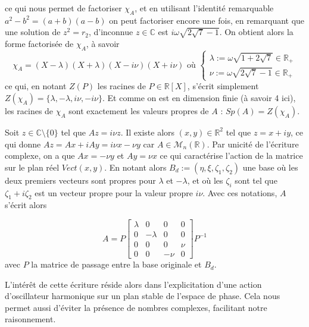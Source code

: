 \documentclass[12pt]{article}
\begin{document}
	ce qui nous permet de factoriser $\chi_A$, et en utilisant l'identité remarquable $a^2-b^2 = (a+b)(a-b)$ on peut factoriser encore une fois, en remarquant que une solution de $z^2 = r_2$, d'inconnue $z \in \mathbb{C}$ est $i\omega\sqrt{2\sqrt{7}-1}$. On obtient alors la forme factorisée de $\chi_A$, à savoir
	\begin{equation}
		\label{polynome carac A scindé}
		\chi_A = (X-\lambda)(X+\lambda)(X-i\nu)(X+i\nu)
	\text{ où }
	\begin{cases}
		\lambda := \omega\sqrt{1+2\sqrt{7}} \in \mathbb{R}_+
		\\
		\nu := \omega\sqrt{2\sqrt{7}-1} \in \mathbb{R}_+
	\end{cases}
	\end{equation}
	ce qui, en notant $Z(P)$ les racines de $P \in \mathbb{R}[X]$, s'écrit simplement $Z(\chi_A) = \{\lambda, -\lambda, i\nu, -i\nu\}$. Et comme on est en dimension finie (à savoir 4 ici), les racines de $\chi_A$ sont exactement les valeurs propres de $A$ : $Sp(A) = Z(\chi_A)$.
	
	Soit $z \in \mathbb{C} \setminus \{0\}$ tel que $Az = i\nu z$. Il existe alors $(x,y) \in \mathbb{R}^2$ tel que $z=x+iy$, ce qui donne $Az = Ax + iAy = i\nu x - \nu y$ car $A \in \mathcal{M}_n(\mathbb{R})$. Par unicité de l'écriture complexe, on a que $Ax = -\nu y$ et $Ay = \nu x$ ce qui caractérise l'action de la matrice sur le plan réel $Vect(x,y)$. En notant alors $B_d := (\eta,\xi,\zeta_1,\zeta_2)$ une base où les deux premiers vecteurs sont propres pour $\lambda$ et $-\lambda$, et où les $\zeta_i$ sont tel que $\zeta_1 + i\zeta_2$ est un vecteur propre pour la valeur propre $i\nu$. Avec ces notations, $A$ s'écrit alors
	
	\begin{equation}
		\label{eq du mvt dz}
		A
		=
		P
		\begin{bmatrix}
			\lambda & 0 & 0 & 0
			\\
			0 & -\lambda & 0 & 0
			\\
			0 & 0 & 0 & \nu
			\\
			0 & 0 & -\nu & 0
		\end{bmatrix}
		P^{-1}
	\end{equation}
	avec $P$ la matrice de passage entre la base originale et $B_d$.
	
	L'intérêt de cette écriture réside alors dans l'explicitation d'une action d'oscillateur harmonique sur un plan stable de l'espace de phase. Cela nous permet aussi d'éviter la présence de nombres complexes, facilitant notre raisonnement.
	
\end{document}
